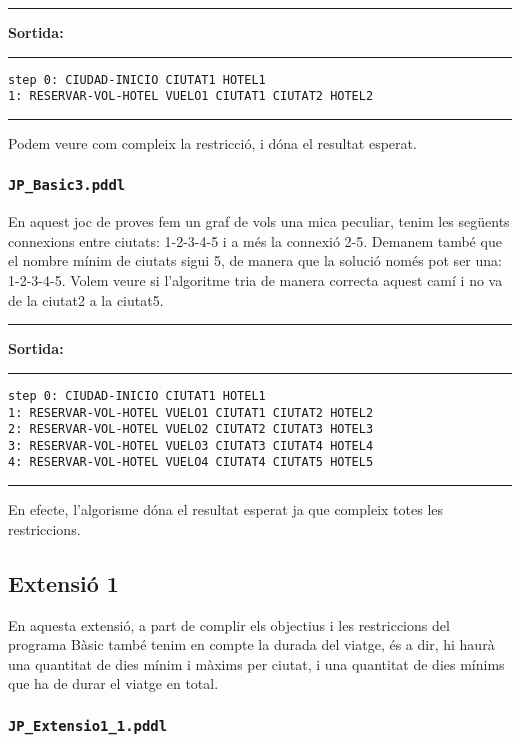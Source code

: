 \documentclass[11pt,a4paper]{article}
\begin{document}
\begin{samepage}
\medskip
\noindent
\rule{0.1\textwidth}{0.5mm}
\textbf{Sortida:}
\rule{0.76\textwidth}{0.5mm}
\begin{verbatim}
step 0: CIUDAD-INICIO CIUTAT1 HOTEL1
1: RESERVAR-VOL-HOTEL VUELO1 CIUTAT1 CIUTAT2 HOTEL2
\end{verbatim}
\rule{\textwidth}{0.5mm}
\medskip
\end{samepage}

Podem veure com compleix la restricció, i dóna el resultat esperat.

\subsubsection*{\texttt{JP\_Basic3.pddl}}

En aquest joc de proves fem un graf de vols una mica peculiar, tenim les següents connexions entre ciutats: 1-2-3-4-5 i a més la connexió 2-5. Demanem també que el nombre mínim de ciutats sigui 5, de manera que la solució només pot ser una: 1-2-3-4-5. Volem veure si l'algoritme tria de manera correcta aquest camí i no va de la ciutat2 a la ciutat5.

\begin{samepage}
\medskip
\noindent
\rule{0.1\textwidth}{0.5mm}
\textbf{Sortida:}
\rule{0.76\textwidth}{0.5mm}
\begin{verbatim}
step 0: CIUDAD-INICIO CIUTAT1 HOTEL1
1: RESERVAR-VOL-HOTEL VUELO1 CIUTAT1 CIUTAT2 HOTEL2
2: RESERVAR-VOL-HOTEL VUELO2 CIUTAT2 CIUTAT3 HOTEL3
3: RESERVAR-VOL-HOTEL VUELO3 CIUTAT3 CIUTAT4 HOTEL4
4: RESERVAR-VOL-HOTEL VUELO4 CIUTAT4 CIUTAT5 HOTEL5
\end{verbatim}
\rule{\textwidth}{0.5mm}
\medskip
\end{samepage}

En efecte, l'algorisme dóna el resultat esperat ja que compleix totes les restriccions.

\subsection{Extensió 1}

En aquesta extensió, a part de complir els objectius i les restriccions del programa Bàsic també tenim en compte la durada del viatge, és a dir, hi haurà una quantitat de dies mínim i màxims per ciutat, i una quantitat de dies mínims que ha de durar el viatge en total.

\subsubsection*{\texttt{JP\_Extensio1\_1.pddl}}
\end{document}
